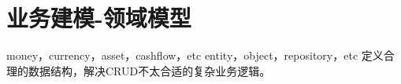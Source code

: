 \chapter{业务建模-领域模型}

money，currency，asset，cashflow，etc
entity，object，repository，etc
定义合理的数据结构，解决CRUD不太合适的复杂业务逻辑。